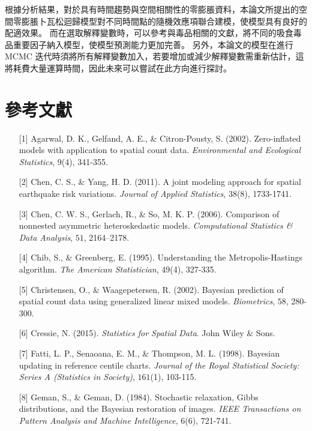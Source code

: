 \documentclass[12pt,a4paper]{article}
\begin{document}
\begin{CJK}{UTF8}{bkai}
根據分析結果，對於具有時間趨勢與空間相關性的零膨脹資料，本論文所提出的空間零膨脹卜瓦松迴歸模型對不同時間點的隨機效應項聯合建模，使模型具有良好的配適效果。
而在選取解釋變數時，可以參考與毒品相關的文獻，將不同的吸食毒品重要因子納入模型，使模型預測能力更加完善。
另外，本論文的模型在進行 MCMC 迭代時須將所有解釋變數加入，若要增加或減少解釋變數需重新估計，這將耗費大量運算時間，因此未來可以嘗試在此方向進行探討。

\newpage
\section*{參考文獻}
\begin{enumerate}
\item[{[1]}] Agarwal, D. K., Gelfand, A. E., \& Citron-Pousty, S. (2002). Zero-inflated models with application to spatial count data. \emph{Environmental and Ecological Statistics}, $\mathit{9}$(4), 341-355.
\item[{[2]}] Chen, C. S., \& Yang, H. D. (2011). A joint modeling approach for spatial earthquake risk variations. \emph{Journal of Applied Statistics}, $\mathit{38}$(8), 1733-1741.
\item[{[3]}] Chen, C. W. S., Gerlach, R., \& So, M. K. P. (2006). Comparison of nonnested asymmetric heteroskedastic models. \emph{Computational Statistics \& Data Analysis}, $\mathit{51}$, 2164–2178.
\item[{[4]}] Chib, S., \& Greenberg, E. (1995). Understanding the Metropolis-Hastings algorithm. \emph{The American Statistician}, $\mathit{49}$(4), 327-335.
\item[{[5]}] Christensen, O., \&  Waagepetersen, R. (2002). Bayesian prediction of spatial count data using generalized linear mixed models. \emph{Biometrics}, $\mathit{58}$, 280-300.
\item[{[6]}] Cressie, N. (2015). \emph{Statistics for Spatial Data}. John Wiley \& Sons.
\item[{[7]}] Fatti, L. P., Senaoana, E. M., \& Thompson, M. L. (1998). Bayesian updating in reference centile charts. \emph{Journal of the Royal Statistical Society: Series A (Statistics in Society)}, $\mathit{161}$(1), 103-115.
\item[{[8]}] Geman, S., \& Geman, D. (1984). Stochastic relaxation, Gibbs distributions, and the Bayesian restoration of images. \emph{IEEE Transactions on Pattern Analysis and Machine Intelligence}, $\mathit{6}$(6), 721-741.

\end{enumerate}
\end{CJK}
\end{document}
